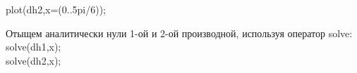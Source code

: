 \documentclass[russian,utf8,nocolumnxxxi,nocolumnxxxii]{eskdtext}
\begin{document}
plot(dh2,x=(0..5pi/6));\\
\begin{figure}[H]
\begin{center}
\begin{minipage}[h]{0.77\linewidth}
\end{minipage}
\end{center}
\end{figure}
\begin{figure}[H]
\begin{center}
\begin{minipage}[h]{0.75\linewidth}
\end{minipage}
\end{center}
\end{figure}
Отыщем аналитически нули 1-ой и 2-ой производной, используя оператор solve:\\
solve(dh1,x);\\
solve(dh2,x);\\
\\
\newpage
\end{document}
